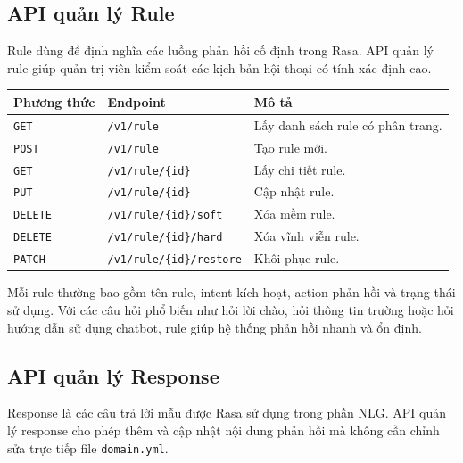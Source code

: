 \subsection{API quản lý Rule}

Rule dùng để định nghĩa các luồng phản hồi cố định trong Rasa. API quản lý rule giúp quản trị viên kiểm soát các kịch bản hội thoại có tính xác định cao.

\begin{longtable}{|p{3cm}|p{5cm}|p{7cm}|}
\hline
\textbf{Phương thức} & \textbf{Endpoint} & \textbf{Mô tả} \\
\hline
\texttt{GET} & \texttt{/v1/rule} & Lấy danh sách rule có phân trang. \\
\hline
\texttt{POST} & \texttt{/v1/rule} & Tạo rule mới. \\
\hline
\texttt{GET} & \texttt{/v1/rule/\{id\}} & Lấy chi tiết rule. \\
\hline
\texttt{PUT} & \texttt{/v1/rule/\{id\}} & Cập nhật rule. \\
\hline
\texttt{DELETE} & \texttt{/v1/rule/\{id\}/soft} & Xóa mềm rule. \\
\hline
\texttt{DELETE} & \texttt{/v1/rule/\{id\}/hard} & Xóa vĩnh viễn rule. \\
\hline
\texttt{PATCH} & \texttt{/v1/rule/\{id\}/restore} & Khôi phục rule. \\
\hline
\end{longtable}

Mỗi rule thường bao gồm tên rule, intent kích hoạt, action phản hồi và trạng thái sử dụng. Với các câu hỏi phổ biến như hỏi lời chào, hỏi thông tin trường hoặc hỏi hướng dẫn sử dụng chatbot, rule giúp hệ thống phản hồi nhanh và ổn định.

\subsection{API quản lý Response}

Response là các câu trả lời mẫu được Rasa sử dụng trong phần NLG. API quản lý response cho phép thêm và cập nhật nội dung phản hồi mà không cần chỉnh sửa trực tiếp file \texttt{domain.yml}.

